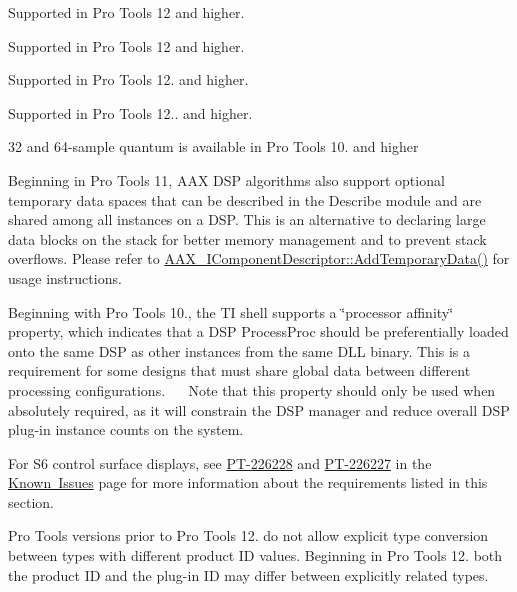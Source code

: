 \begin{DoxyRefList}
\label{a00786__compatibility_notes000017}%
%
 Supported in Pro Tools 12 and higher.

\label{a00786__compatibility_notes000018}%
%
 Supported in Pro Tools 12 and higher.

\label{a00786__compatibility_notes000019}%
%
 Supported in Pro Tools 12. and higher.

\label{a00786__compatibility_notes000020}%
%
 Supported in Pro Tools 12.. and higher. 
\item[Module \mbox{\hyperlink{a00832}{A\+A\+X\+\_\+\+T\+I\+\_\+\+Guide}} ]\label{a00786__compatibility_notes000022}%
%
 32 and 64-\/sample quantum is available in Pro Tools 10. and higher

\label{a00786__compatibility_notes000023}%
%
 Beginning in Pro Tools 11, A\+AX D\+SP algorithms also support optional temporary data spaces that can be described in the Describe module and are shared among all instances on a D\+SP. This is an alternative to declaring large data blocks on the stack for better memory management and to prevent stack overflows. Please refer to \mbox{\hyperlink{a01781_ad8daad601b60fdbd6134fe0c8faa2fc4}{A\+A\+X\+\_\+\+I\+Component\+Descriptor\+::\+Add\+Temporary\+Data()}} for usage instructions.

\label{a00786__compatibility_notes000024}%
%
 Beginning with Pro Tools 10., the TI shell supports a \char`\"{}processor affinity\char`\"{} property, which indicates that a D\+SP Process\+Proc should be preferentially loaded onto the same D\+SP as other instances from the same D\+LL binary. This is a requirement for some designs that must share global data between different processing configurations.~\newline
 ~\newline
 Note that this property should only be used when absolutely required, as it will constrain the D\+SP manager and reduce overall D\+SP plug-\/in instance counts on the system. 
\item[Module \mbox{\hyperlink{a00812}{Additional\+Features\+\_\+\+Curve\+Displays}} ]\label{a00786__compatibility_notes000001}%
%
 For S6 control surface displays, see \mbox{\hyperlink{a00846_PT-226228}{P\+T-\/226228}} and \mbox{\hyperlink{a00846_PT-226227}{P\+T-\/226227}} in the \mbox{\hyperlink{a00846}{Known Issues}} page for more information about the requirements listed in this section. 
\item[Module \mbox{\hyperlink{a00826}{advanced\+Topics\+\_\+related\+Types}} ]\label{a00786__compatibility_notes000009}%
%
 Pro Tools versions prior to Pro Tools 12. do not allow explicit type conversion between types with different product ID values. Beginning in Pro Tools 12. both the product ID and the plug-\/in ID may differ between explicitly related types.


\end{DoxyRefList}
